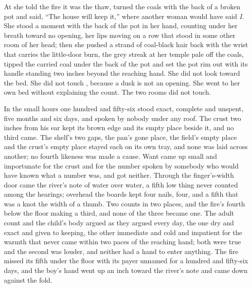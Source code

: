At  she told the fire it was the thaw, turned the coals with the back of a broken pot and said, “The house will keep it,” where another woman would have said \emph{I}. She stood a moment with the back of the pot in her hand, counting under her breath toward no opening, her lips moving on a row that stood in some other room of her head; then she pushed a strand of coal-black hair back with the wrist that carries the little-door burn, the grey streak at her temple pale off the coals, tipped the carried coal under the back of the pot and set the pot rim out with its handle standing two inches beyond the reaching hand. She did not look toward the bed. She did not touch , because a dusk is not an opening. She went to her own bed without explaining the count. The two rooms did not touch.

In the small hours one hundred and fifty-six stood exact, complete and unspent, five months and six days, and spoken by nobody under any roof. The crust two inches from his ear kept its brown edge and its empty place beside it, and no third came. The shelf's two gaps, the pan's gone place, the field's empty place and the crust's empty place stayed each on its own tray, and none was laid across another; no fourth likeness was made a cause. Want came up small and importunate for the crust and for the number spoken by somebody who would have known what a number was, and got neither. Through the finger's-width door came the river's note of water over water, a fifth low thing never counted among the hearings; overhead the boards kept four nails, four, and a fifth that was a knot the width of a thumb. Two counts in two places, and the fire's fourth below the floor making a third, and none of the three became one. The adult count and the child's body argued as they argued every day, the one dry and exact and given to keeping, the other immediate and cold and impatient for the warmth that never came within two paces of the reaching hand; both were true and the second was louder, and neither had a hand to enter anything. The fire missed its fifth under the floor with its payer unnamed for a hundred and fifty-six days, and the boy's hand went up an inch toward the river's note and came down against the fold.
